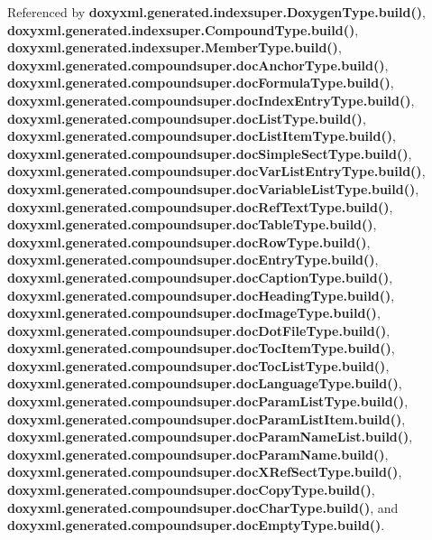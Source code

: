 Referenced by {\bf doxyxml.\+generated.\+indexsuper.\+Doxygen\+Type.\+build()}, {\bf doxyxml.\+generated.\+indexsuper.\+Compound\+Type.\+build()}, {\bf doxyxml.\+generated.\+indexsuper.\+Member\+Type.\+build()}, {\bf doxyxml.\+generated.\+compoundsuper.\+doc\+Anchor\+Type.\+build()}, {\bf doxyxml.\+generated.\+compoundsuper.\+doc\+Formula\+Type.\+build()}, {\bf doxyxml.\+generated.\+compoundsuper.\+doc\+Index\+Entry\+Type.\+build()}, {\bf doxyxml.\+generated.\+compoundsuper.\+doc\+List\+Type.\+build()}, {\bf doxyxml.\+generated.\+compoundsuper.\+doc\+List\+Item\+Type.\+build()}, {\bf doxyxml.\+generated.\+compoundsuper.\+doc\+Simple\+Sect\+Type.\+build()}, {\bf doxyxml.\+generated.\+compoundsuper.\+doc\+Var\+List\+Entry\+Type.\+build()}, {\bf doxyxml.\+generated.\+compoundsuper.\+doc\+Variable\+List\+Type.\+build()}, {\bf doxyxml.\+generated.\+compoundsuper.\+doc\+Ref\+Text\+Type.\+build()}, {\bf doxyxml.\+generated.\+compoundsuper.\+doc\+Table\+Type.\+build()}, {\bf doxyxml.\+generated.\+compoundsuper.\+doc\+Row\+Type.\+build()}, {\bf doxyxml.\+generated.\+compoundsuper.\+doc\+Entry\+Type.\+build()}, {\bf doxyxml.\+generated.\+compoundsuper.\+doc\+Caption\+Type.\+build()}, {\bf doxyxml.\+generated.\+compoundsuper.\+doc\+Heading\+Type.\+build()}, {\bf doxyxml.\+generated.\+compoundsuper.\+doc\+Image\+Type.\+build()}, {\bf doxyxml.\+generated.\+compoundsuper.\+doc\+Dot\+File\+Type.\+build()}, {\bf doxyxml.\+generated.\+compoundsuper.\+doc\+Toc\+Item\+Type.\+build()}, {\bf doxyxml.\+generated.\+compoundsuper.\+doc\+Toc\+List\+Type.\+build()}, {\bf doxyxml.\+generated.\+compoundsuper.\+doc\+Language\+Type.\+build()}, {\bf doxyxml.\+generated.\+compoundsuper.\+doc\+Param\+List\+Type.\+build()}, {\bf doxyxml.\+generated.\+compoundsuper.\+doc\+Param\+List\+Item.\+build()}, {\bf doxyxml.\+generated.\+compoundsuper.\+doc\+Param\+Name\+List.\+build()}, {\bf doxyxml.\+generated.\+compoundsuper.\+doc\+Param\+Name.\+build()}, {\bf doxyxml.\+generated.\+compoundsuper.\+doc\+X\+Ref\+Sect\+Type.\+build()}, {\bf doxyxml.\+generated.\+compoundsuper.\+doc\+Copy\+Type.\+build()}, {\bf doxyxml.\+generated.\+compoundsuper.\+doc\+Char\+Type.\+build()}, and {\bf doxyxml.\+generated.\+compoundsuper.\+doc\+Empty\+Type.\+build()}.



